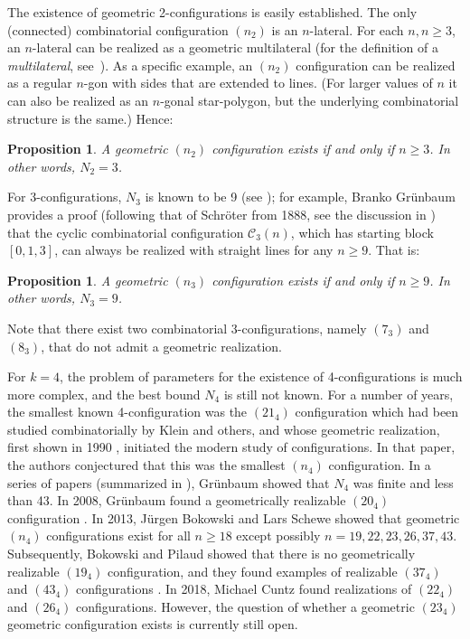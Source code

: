 \documentclass[reqno,12pt]{amsart}
\theoremstyle{plain}
\newtheorem{prop}[theorem]{Proposition}
\theoremstyle{definition}
\theoremstyle{remark}
\newcommand{\mc}[1]{\mathcal{#1}}
\begin{document}
The existence of geometric 2-configurations is easily established. The only (connected) combinatorial configuration $(n_2)$ is an $n$-lateral. 
For each $n, n\geq 3$, an $n$-lateral can be realized as a geometric multilateral (for the definition of a \emph{multilateral}, see~\cite{Gru2009b}). 
As a specific example, an $(n_{2})$ configuration can be realized as a regular $n$-gon with sides that are extended to lines. (For larger values 
of $n$ it can also be realized as an $n$-gonal star-polygon, but the underlying combinatorial structure is the same.) Hence:
%
\begin{prop}\label{thm:n2}
A geometric $(n_2)$ configuration exists if and only if $n \geq 3$. In other words, $N_2 = 3$.
\end{prop}
%
For 3-configurations, $N_{3}$ is known to be 9 (see \cite[Section 2.1]{Gru2009b}); for example, Branko Gr\"{u}nbaum provides a proof 
(following that of Schr\"{o}ter from 1888, see the discussion in \cite[p. 65]{Gru2009b}) that the cyclic combinatorial configuration 
$\mc{C}_{3}(n)$, which has starting block $[0,1,3]$, can always be realized with straight lines for any $n \geq 9$. That is:
%
\begin{prop}\label{thm:n3}
A geometric $(n_3)$ configuration exists if and only if $n \geq 9$. In other words, $N_3 = 9$.
\end{prop}
%
Note that there exist two combinatorial 3-configurations, 
namely $(7_3)$ and $(8_3)$, that do not admit a geometric realization. 

For $k = 4$, the problem of parameters for the existence of 4-configurations is much more complex, 
and the best bound $N_4$ is still not known. For a number of years, the smallest known 4-configuration 
was the $(21_{4})$ configuration which had been studied combinatorially by Klein and others, and 
whose geometric realization, first shown in 1990 \cite{GruRig1990}, initiated the modern study of 
configurations. In that paper, the authors conjectured that this was the smallest $(n_{4})$ configuration. 
In a series of papers \cite{Gru2000, Gru2000b, Gru2002, Gru2006} (summarized in \cite[Sections 3.1-3.4]{Gru2009b}), 
Gr\"unbaum showed that $N_{4}$ was finite and less than 43. In 2008, Gr\"{u}nbaum found a geometrically 
realizable $(20_{4})$ configuration \cite{Gru2008a}. In 2013, J\"{u}rgen Bokowski and Lars Schewe \cite{BokSch2013} 
showed that geometric $(n_{4})$ configurations exist for all $n \geq 18$ except possibly $n = 19, 22, 23, 26, 37, 43$. 
Subsequently, Bokowski and Pilaud \cite{BokPil2015} showed that there is no geometrically realizable $(19_{4})$ configuration, 
and they found examples of realizable $(37_{4})$ and $(43_{4})$ configurations \cite{BokPil2016}. In 2018, Michael 
Cuntz \cite{Cun2018} found realizations of $(22_{4})$ and $(26_{4})$ configurations. However, the question of whether 
a geometric $(23_{4})$ geometric configuration exists is currently still open.
\end{document}
